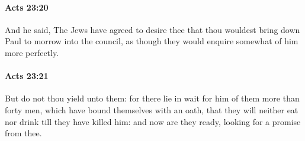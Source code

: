 		\paragraph{Acts 23:20} %
			\label{ACTS-23-20}

			And he said, The Jews have agreed to desire thee that thou wouldest bring down Paul to morrow into the council, as though they would enquire somewhat of him more perfectly.

			\begin{framed}
			\scriptsize
				\begin{compactdesc}
					\item[SBLG] 
				\end{compactdesc}
			\end{framed}

		\paragraph{Acts 23:21} %
			\label{ACTS-23-21}

			But do not thou yield unto them: for there lie in wait for him of them more than forty men, which have bound themselves with an oath, that they will neither eat nor drink till they have killed him: and now are they ready, looking for a promise from thee.

